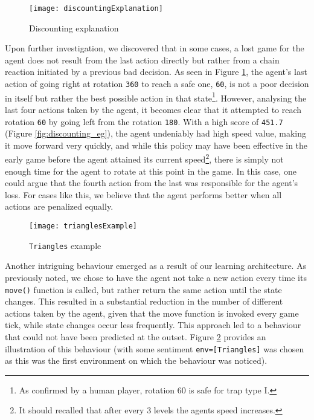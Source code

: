 \label{intbeh}
\begin{figure}[h]
    \centering
    \texttt{[image: discountingExplanation]}
    \caption{Discounting explanation}
    \label{fig:discounting_expl}
\end{figure}

Upon further investigation, we discovered that in some cases, a lost game for the agent does not result from the last action directly but rather from a chain reaction initiated by a previous bad decision. As seen in Figure \ref{fig:discounting_expl}, the agent's last action of going right at rotation \texttt{360} to reach a safe one, \texttt{60}, is not a poor decision in itself but rather the best possible action in that state\footnote{As confirmed by a human player, rotation 60 is safe for trap type I.}. However, analysing the last four actions taken by the agent, it becomes clear that it attempted to reach rotation \texttt{60} by going left from the rotation \texttt{180}. With a high score of \texttt{451.7} (Figure \ref{fig:discounting_eg}), the agent undeniably had high speed value, making it move forward very quickly, and while this policy may have been effective in the early game before the agent attained its current speed\footnote{It should recalled that after every 3 levels the agents speed increases.}, there is simply not enough time for the agent to rotate at this point in the game. In this case, one could argue that the fourth action from the last was responsible for the agent's loss. For cases like this, we believe that the agent performs better when all actions are penalized equally.


\label{intbeh}
\begin{figure}[h]
    \centering
    \texttt{[image: trianglesExample]}
    \caption{\texttt{Triangles} example}
    \label{fig:triangles_intbeh_eg}
\end{figure}

Another intriguing behaviour emerged as a result of our learning architecture. As previously noted, we chose to have the agent not take a new action every time its \texttt{move()} function is called, but rather return the same action until the state changes. This resulted in a substantial reduction in the number of different actions taken by the agent, given that the move function is invoked every game tick, while state changes occur less frequently. This approach led to a behaviour that could not have been predicted at the outset. Figure \ref{fig:triangles_intbeh_eg} provides an illustration of this behaviour (with some sentiment \texttt{env=[Triangles]} was chosen as this was the first environment on which the behaviour was noticed).

